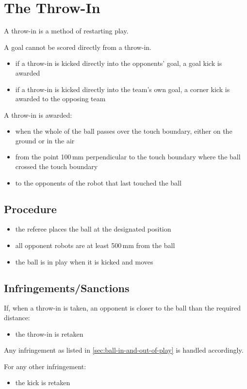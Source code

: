 \section{The Throw-In}\label{sec:throw-in}

A throw-in is a method of restarting play.

A goal cannot be scored directly from a throw-in.

\begin{itemize}
\item if a throw-in is kicked directly into the opponents' goal, a goal kick is awarded
\item if a throw-in is kicked directly into the team's own goal, a corner kick is awarded to the opposing team
\end{itemize}

A throw-in is awarded:

\begin{itemize}
\item when the whole of the ball passes over the touch boundary, either on the ground or in the air
\item from the point 100\,mm perpendicular to the touch boundary where the ball crossed the touch boundary
\item to the opponents of the robot that last touched the ball
\end{itemize}

\subsection{Procedure}
\begin{itemize}
\item the referee places the ball at the designated position
\item all opponent robots are at least 500\,mm from the ball
\item the ball is in play when it is kicked and moves
\end{itemize}

\subsection{Infringements/Sanctions}
If, when a throw-in is taken, an opponent is closer to the ball than the required distance:

\begin{itemize}
\item the throw-in is retaken
\end{itemize}

Any infringement as listed in \autoref{sec:ball-in-and-out-of-play} is handled accordingly.

For any other infringement:

\begin{itemize}
\item the kick is retaken
\end{itemize}
